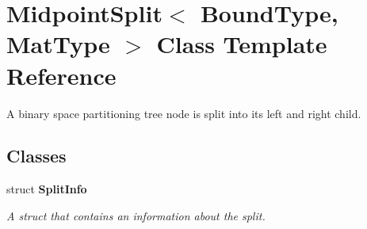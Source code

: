 \section{Midpoint\+Split$<$ Bound\+Type, Mat\+Type $>$ Class Template Reference}
\label{classmlpack_1_1tree_1_1MidpointSplit}


A binary space partitioning tree node is split into its left and right child.  


\subsection*{Classes}
\begin{DoxyCompactItemize}
\item 
struct \textbf{ Split\+Info}
\begin{DoxyCompactList}\small\item\em A struct that contains an information about the split. \end{DoxyCompactList}\end{DoxyCompactItemize}
